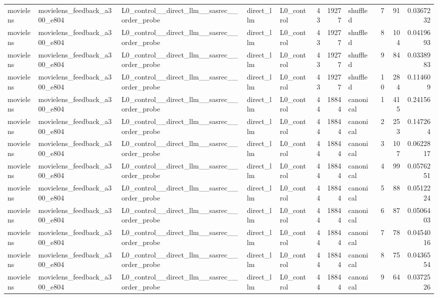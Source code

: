 \begin{table}[htbp!]
\begin{tabular}{lllllrrlrrr}
movielens & movielens\_feedback\_a300\_e804 & L0\_control\_\_direct\_llm\_\_sasrec\_\_order\_probe & direct\_llm & L0\_control & 43 & 19277 & shuffled & 7 & 91 & 0.0367232 \\
movielens & movielens\_feedback\_a300\_e804 & L0\_control\_\_direct\_llm\_\_sasrec\_\_order\_probe & direct\_llm & L0\_control & 43 & 19277 & shuffled & 8 & 104 & 0.0419693 \\
movielens & movielens\_feedback\_a300\_e804 & L0\_control\_\_direct\_llm\_\_sasrec\_\_order\_probe & direct\_llm & L0\_control & 43 & 19277 & shuffled & 9 & 84 & 0.0338983 \\
movielens & movielens\_feedback\_a300\_e804 & L0\_control\_\_direct\_llm\_\_sasrec\_\_order\_probe & direct\_llm & L0\_control & 43 & 19277 & shuffled & 10 & 284 & 0.114609 \\
movielens & movielens\_feedback\_a300\_e804 & L0\_control\_\_direct\_llm\_\_sasrec\_\_order\_probe & direct\_llm & L0\_control & 44 & 18844 & canonical & 1 & 415 & 0.24156 \\
movielens & movielens\_feedback\_a300\_e804 & L0\_control\_\_direct\_llm\_\_sasrec\_\_order\_probe & direct\_llm & L0\_control & 44 & 18844 & canonical & 2 & 253 & 0.147264 \\
movielens & movielens\_feedback\_a300\_e804 & L0\_control\_\_direct\_llm\_\_sasrec\_\_order\_probe & direct\_llm & L0\_control & 44 & 18844 & canonical & 3 & 107 & 0.0622817 \\
movielens & movielens\_feedback\_a300\_e804 & L0\_control\_\_direct\_llm\_\_sasrec\_\_order\_probe & direct\_llm & L0\_control & 44 & 18844 & canonical & 4 & 99 & 0.0576251 \\
movielens & movielens\_feedback\_a300\_e804 & L0\_control\_\_direct\_llm\_\_sasrec\_\_order\_probe & direct\_llm & L0\_control & 44 & 18844 & canonical & 5 & 88 & 0.0512224 \\
movielens & movielens\_feedback\_a300\_e804 & L0\_control\_\_direct\_llm\_\_sasrec\_\_order\_probe & direct\_llm & L0\_control & 44 & 18844 & canonical & 6 & 87 & 0.0506403 \\
movielens & movielens\_feedback\_a300\_e804 & L0\_control\_\_direct\_llm\_\_sasrec\_\_order\_probe & direct\_llm & L0\_control & 44 & 18844 & canonical & 7 & 78 & 0.0454016 \\
movielens & movielens\_feedback\_a300\_e804 & L0\_control\_\_direct\_llm\_\_sasrec\_\_order\_probe & direct\_llm & L0\_control & 44 & 18844 & canonical & 8 & 75 & 0.0436554 \\
movielens & movielens\_feedback\_a300\_e804 & L0\_control\_\_direct\_llm\_\_sasrec\_\_order\_probe & direct\_llm & L0\_control & 44 & 18844 & canonical & 9 & 64 & 0.0372526 \\

\end{tabular}
\end{table}
